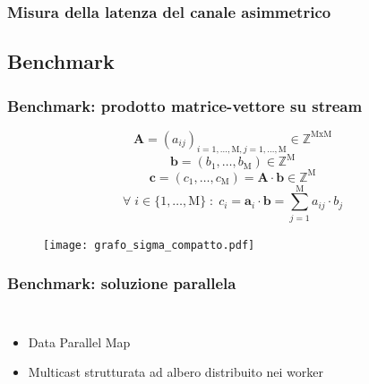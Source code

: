 \documentclass{beamer}
\begin{document}
\begin{frame}
  \frametitle{Misura della latenza del canale asimmetrico}
  \begin{figure}
    \resizebox{\columnwidth}{!}{}
  \end{figure}
\end{frame}

\subsection{Benchmark}

\begin{frame}
  \frametitle{Benchmark: prodotto matrice-vettore su stream}
  \[ \mathbf{A} = (a_{ij})_{i=1,\ldots,\mathrm{M}, j=1,\ldots,\mathrm{M}} \in \mathbb{Z}^{\mathrm{MxM}} \]
  \[ \mathbf{b} = (b_1,\ldots,b_\mathrm{M}) \in \mathbb{Z}^{\mathrm{M}} \]
  \[ \mathbf{c} = (c_1,\ldots,c_\mathrm{M}) = \mathbf{A} \cdot \mathbf{b} \in \mathbb{Z}^{\mathrm{M}} \]
  \[ \forall \; i \in \{1,\ldots,\mathrm{M}\} \; : \; c_i = \mathbf{a}_i \cdot \mathbf{b} = \sum_{j=1}^{\mathrm{M}} a_{ij} \cdot b_j  \]
  
  \begin{figure}
    \texttt{[image: grafo\_sigma\_compatto.pdf]}
  \end{figure}
\end{frame}



\begin{frame}
  \frametitle{Benchmark: soluzione parallela}
  \begin{columns}[c]
    \begin{itemize}
\item Data Parallel Map
\item Multicast strutturata ad albero distribuito nei worker
\end{itemize}
  \begin{figure}
  \end{figure}  

  \end{columns}
\end{frame}
\end{document}
